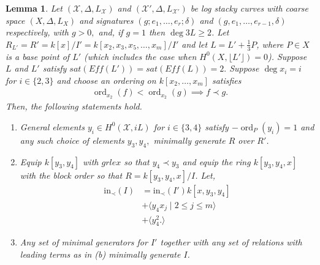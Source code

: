 \documentclass{amsart}
\theoremstyle{plain}
\newtheorem{lem}[thm]{Lemma}
\theoremstyle{definition}
\theoremstyle{remark}
\numberwithin{equation}{section}
\newcommand \sx{\mathscr X}
\DeclareMathOperator{\ord}{ord}
\newcommand \halfcan{L}
\newcommand \initial{\text{in}}
\begin{document}
\begin{lem}
\label{lem:sat-two-induction-high-genus}
Let $(\sx, \Delta, \halfcan_\sx)$ and $(\sx', \Delta, \halfcan_{\sx'})$ be log stacky curves with coarse space $(X, \Delta, L_X)$ and signatures $(g; e_1, \ldots, e_r; \delta)$ and $(g, e_1, \ldots, e_{r-1}, \delta)$ respectively, with $g > 0,$ and, if $g = 1$ then $\deg 3L \geq 2$.
Let $R_{L'} = R' = k[x]/I'= k[x_2, x_3
, x_5,\ldots, x_m]/I'$ and let $\halfcan = \halfcan' + \frac{1}{
3}P$, where $P\in X$ is a base point of $\halfcan'$ (which includes the case when $H^0(X,\lfloor \halfcan'\rfloor)=0$).  Suppose $\halfcan$ and $\halfcan'$ satisfy $sat(Eff(\halfcan')) = sat(Eff(\halfcan)) = 2.$
Suppose $\deg x_i = i$ for $i \in \{2, 3\}$ and choose an ordering on $k[x_2, \ldots, x_m]$ satisfies
\begin{align*}
	\ord_{x_2}(f) < \ord_{x_2}(g) \implies f \prec g.
\end{align*}
Then, the following statements hold.
\begin{enumerate}
	\item[(a)] General elements  $y_i \in H^0(\sx,iL)$ for $i \in \{3, 4\}$ satisfy $-\ord_P(y_i) = 1$ and any such choice of elements $y
		_3,y_4,$ minimally generate $R$ over $R'$.
	\item[(b)] Equip $k[y_3, y_4]$ with $grlex$ so that $y_4 \prec 
		y_3$
		and equip the ring $k[y_3, y_4, x]$ with the block 
		order so that $R = k[y_3, y_4, x]/I$. Let,
		\begin{align*}
			\initial_\prec(I) &= \initial_\prec(I')k[x, y_3, y_4] \\
			&+\langle y_4 x_j \mid 2 \leq j \leq m \rangle \\
			&+\langle y_4^2.\rangle
		\end{align*}
	\item[(c)] Any set of minimal generators for $I'$ together with 
		any set of relations with leading terms as in (b) minimally 
		generate $I$.
\end{enumerate}
\end{lem}
\end{document}
